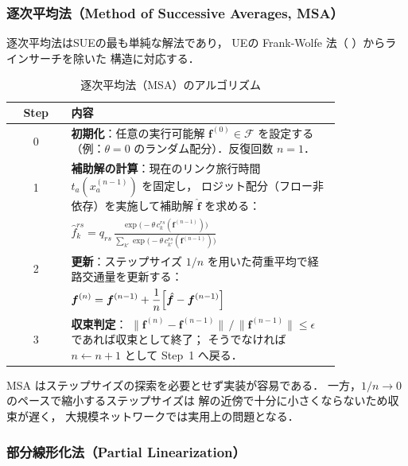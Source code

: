 \subsubsection*{逐次平均法（Method of Successive Averages, MSA）}

逐次平均法はSUEの最も単純な解法であり\cite{Daganzo1977}，
UEの Frank-Wolfe 法（ ）からラインサーチを除いた
構造に対応する．

\begin{table}[hbtp]
  \centering
  \caption{逐次平均法（MSA）のアルゴリズム}
  \label{tab:msa-algorithm}
  \begin{tabular}{cp{0.82\linewidth}}
    \toprule
    Step & 内容 \\
    \midrule
    0 & \textbf{初期化}：任意の実行可能解 $\boldsymbol{f}^{(0)} \in \mathcal{F}$ を設定する
        （例：$\theta = 0$ のランダム配分）．反復回数 $n = 1$．
        \\[4pt]
    1 & \textbf{補助解の計算}：現在のリンク旅行時間 $t_a(x_a^{(n-1)})$ を固定し，
        ロジット配分（フロー非依存）を実施して補助解 $\hat{\boldsymbol{f}}$ を求める：\\
      & \quad $\displaystyle\hat{f}_k^{rs} = q_{rs}\,
          \frac{\exp\!\bigl(-\theta\, c_k^{rs}(\boldsymbol{f}^{(n-1)})\bigr)}
               {\displaystyle\sum_{k'} \exp\!\bigl(-\theta\, c_{k'}^{rs}(\boldsymbol{f}^{(n-1)})\bigr)}$
        \\[4pt]
    2 & \textbf{更新}：ステップサイズ $1/n$ を用いた荷重平均で経路交通量を更新する：\\
      & \quad $\displaystyle\boldsymbol{f}^{(n)}
          = \boldsymbol{f}^{(n-1)}
            + \frac{1}{n}\Bigl[\hat{\boldsymbol{f}} - \boldsymbol{f}^{(n-1)}\Bigr]$
        \\[4pt]
    3 & \textbf{収束判定}：
        $\|\boldsymbol{f}^{(n)} - \boldsymbol{f}^{(n-1)}\|\,/\,\|\boldsymbol{f}^{(n-1)}\| \leq \epsilon$
        であれば収束として終了；
        そうでなければ $n \leftarrow n+1$ として Step~1 へ戻る．
        \\
    \bottomrule
  \end{tabular}
\end{table}

MSA はステップサイズの探索を必要とせず実装が容易である．
一方，$1/n \to 0$ のペースで縮小するステップサイズは
解の近傍で十分に小さくならないため収束が遅く，
大規模ネットワークでは実用上の問題となる\cite{Daganzo1977}．

\subsubsection*{部分線形化法（Partial Linearization）}

